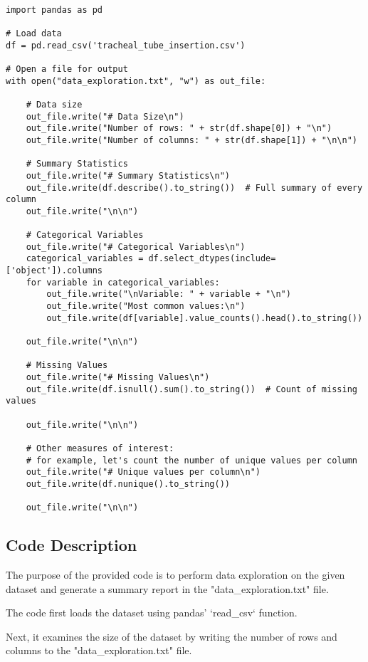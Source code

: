 \documentclass[11pt]{article}
\begin{document}
\begin{verbatim}

import pandas as pd

# Load data
df = pd.read_csv('tracheal_tube_insertion.csv')

# Open a file for output
with open("data_exploration.txt", "w") as out_file:
    
    # Data size
    out_file.write("# Data Size\n")
    out_file.write("Number of rows: " + str(df.shape[0]) + "\n")
    out_file.write("Number of columns: " + str(df.shape[1]) + "\n\n")
    
    # Summary Statistics
    out_file.write("# Summary Statistics\n")
    out_file.write(df.describe().to_string())  # Full summary of every column
    out_file.write("\n\n")
    
    # Categorical Variables
    out_file.write("# Categorical Variables\n")
    categorical_variables = df.select_dtypes(include=['object']).columns
    for variable in categorical_variables:
        out_file.write("\nVariable: " + variable + "\n")
        out_file.write("Most common values:\n")
        out_file.write(df[variable].value_counts().head().to_string())
        
    out_file.write("\n\n")
    
    # Missing Values
    out_file.write("# Missing Values\n")
    out_file.write(df.isnull().sum().to_string())  # Count of missing values

    out_file.write("\n\n")
    
    # Other measures of interest:
    # for example, let's count the number of unique values per column
    out_file.write("# Unique values per column\n")
    out_file.write(df.nunique().to_string())
    
    out_file.write("\n\n")

\end{verbatim}

\subsection{Code Description}

The purpose of the provided code is to perform data exploration on the given dataset and generate a summary report in the "data\_exploration.txt" file. 

The code first loads the dataset using pandas' `read\_csv` function. 

Next, it examines the size of the dataset by writing the number of rows and columns to the "data\_exploration.txt" file. 
\end{document}
